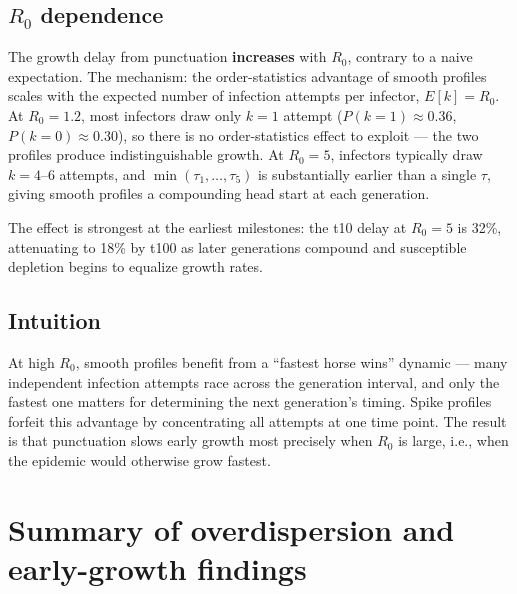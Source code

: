 \documentclass[11pt]{article}
\begin{document}
\subsection{\texorpdfstring{$R_0$}{R0} dependence}

The growth delay from punctuation \textbf{increases} with $R_0$, contrary to a naive expectation. The mechanism: the order-statistics advantage of smooth profiles scales with the expected number of infection attempts per infector, $E[k] = R_0$. At $R_0 = 1.2$, most infectors draw only $k = 1$ attempt ($P(k=1) \approx 0.36$, $P(k=0) \approx 0.30$), so there is no order-statistics effect to exploit --- the two profiles produce indistinguishable growth. At $R_0 = 5$, infectors typically draw $k = 4$--$6$ attempts, and $\min(\tau_1, \ldots, \tau_5)$ is substantially earlier than a single $\tau$, giving smooth profiles a compounding head start at each generation.

The effect is strongest at the earliest milestones: the t10 delay at $R_0 = 5$ is 32\%, attenuating to 18\% by t100 as later generations compound and susceptible depletion begins to equalize growth rates.

\subsection{Intuition}

At high $R_0$, smooth profiles benefit from a ``fastest horse wins'' dynamic --- many independent infection attempts race across the generation interval, and only the fastest one matters for determining the next generation's timing. Spike profiles forfeit this advantage by concentrating all attempts at one time point. The result is that punctuation slows early growth most precisely when $R_0$ is large, i.e., when the epidemic would otherwise grow fastest.

\section{Summary of overdispersion and early-growth findings}
\end{document}
